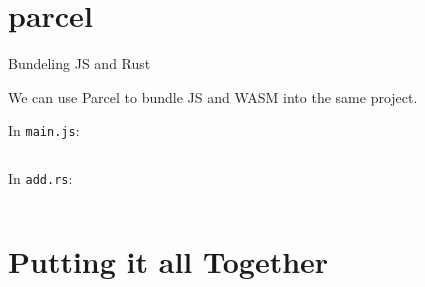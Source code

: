 \documentclass{lug}
\begin{document}
\renewcommand{\secimage}{graphics/parcel_logo}
\section{parcel}

\begin{frame}{Bundeling JS and Rust}

We can use Parcel to bundle JS and WASM into the same project.

In \texttt{main.js}:

\inputminted[fontsize=\footnotesize]{js}{code/add.js}

In \texttt{add.rs}:

\inputminted[fontsize=\footnotesize]{rust}{code/add.rs}

\end{frame}

\renewcommand{\secimage}{graphics/together}
\section{Putting it all Together}
\end{document}
